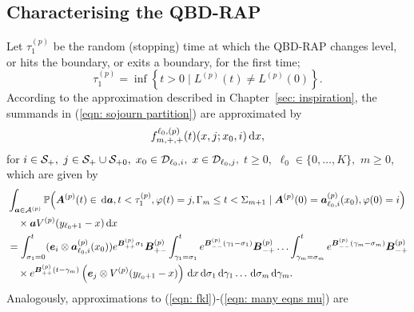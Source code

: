 \subsection{Characterising the QBD-RAP} 
Let \(\tau_1^{(p)}\) be the random (stopping) time at which the QBD-RAP changes level, or hits the boundary, or exits a boundary, for the first time;
\[\tau_1^{(p)} = \inf\left\{t>0\mid L^{(p)}(t)\neq L^{(p)}(0)\right\}.\]
According to the approximation described in Chapter~\ref{sec: inspiration}, the summands in (\ref{eqn: sojourn partition}) are approximated by \[f^{\ell_0,(p)}_{m,+,+}(t)( x,j; x_0,i)\, \mathrm{d} x,\] 
for \(i\in\mathcal{S}_+,\) \(j\in\mathcal{S}_+\cup\mathcal{S}_{+0},\) \(x_0\in\mathcal{D}_{\ell_0,i},\) \(x\in\mathcal{D}_{\ell_0,j},\) \(t\geq0,\) \(\ell_0\in\{0,\dots,K\},\) \(m\geq 0\), which are given by
\begin{align}
	&\int_{\boldsymbol a \in\mathcal A^{(p)}}\mathbb P\Big(\boldsymbol A^{(p)}(t)\in \, \mathrm{d} \boldsymbol a, t<\tau_1^{(p)}, \varphi(t) = j, \Gamma_m\leq t<\Sigma_{m+1} \nonumber
	\mid \boldsymbol A^{(p)}(0) = \boldsymbol   a_{\ell_0,i}^{(p)}(x_0), \varphi(0) = i\Big)
	\\&\quad \times \boldsymbol aV^{(p)}(y_{\ell_0+1}-x)\, \mathrm{d} x\nonumber
	\\
	&=\int_{\sigma_1=0}^t (\boldsymbol e_i\otimes \boldsymbol  a_{\ell_0,i}^{(p)}(x_0)) e^{\boldsymbol{B}^{(p)}_{++}\sigma_1}\boldsymbol{B}^{(p)}_{+-}	\nonumber
	\int_{\gamma_1=\sigma_1}^{t} e^{\boldsymbol{B}^{(p)}_{--}(\gamma_1-\sigma_1)}\boldsymbol{B}^{(p)}_{-+}
	\hdots 
	 \int_{\gamma_m=\sigma_{m}}^{t} e^{\boldsymbol{B}^{(p)}_{--}(\gamma_m-\sigma_{m})}\boldsymbol{B}^{(p)}_{-+}\\&\quad\times
	e^{\boldsymbol{B}^{(p)}_{++}(t-\gamma_m)}\left(\boldsymbol e_j  \otimes V^{(p)}(y_{\ell_0+1}-x)\right)\, \mathrm{d} x
	\, \mathrm{d} \sigma_1\, \mathrm{d} \gamma_1\dots \, \mathrm{d} \sigma_m\, \mathrm{d} \gamma_m. \label{eqn: approx end conv}
\end{align}
Analogously, approximations to (\ref{eqn: fkl})-(\ref{eqn: many eqns mu}) are 
